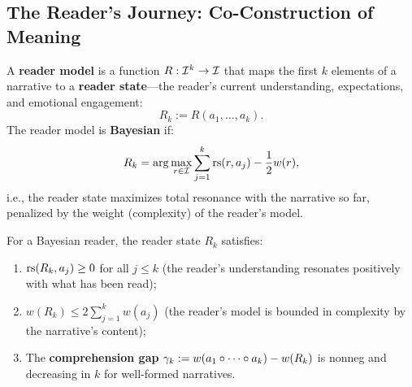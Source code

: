\subsection{The Reader's Journey: Co-Construction of Meaning}

\begin{definition}
\label{def:reader-model}
A \textbf{reader model} is a function $R: \mathcal{I}^k \to \mathcal{I}$ that maps the
first $k$ elements of a narrative to a \textbf{reader state}---the
reader's current understanding, expectations, and emotional engagement:
\[
  R_k := R(a_1, \ldots, a_k).
\]
The reader model is \textbf{Bayesian} if:
\[
  R_k = \arg\max_{r \in \mathcal{I}} \sum_{j=1}^{k} \mathrm{rs}(r, a_j)
  - \frac{1}{2}w(r),
\]
i.e., the reader state maximizes total resonance with the narrative so far,
penalized by the weight (complexity) of the reader's model.
\end{definition}

\begin{theorem}
\label{thm:reader-narrative}
For a Bayesian reader, the reader state $R_k$ satisfies:
\begin{enumerate}
  \item $\mathrm{rs}(R_k, a_j) \geq 0$ for all $j \leq k$ (the reader's
    understanding resonates positively with what has been read);
  \item $w(R_k) \leq 2\sum_{j=1}^{k} w(a_j)$ (the reader's model
    is bounded in complexity by the narrative's content);
  \item The \textbf{comprehension gap}
    $\gamma_k := w(a_1 \circ \cdots \circ a_k) - w(R_k)$
    is nonneg and decreasing in $k$ for well-formed narratives.
\end{enumerate}
\end{theorem}

